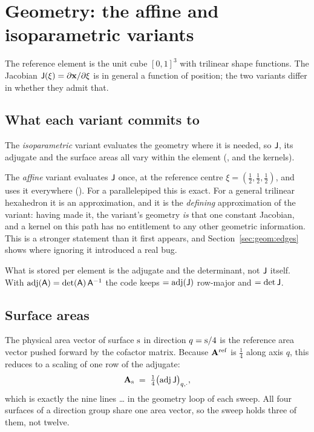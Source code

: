 \section{Geometry: the affine and isoparametric variants}
\label{sec:geom}

The reference element is the unit cube $[0,1]^3$ with trilinear shape functions. The Jacobian
$\mathsf{J}(\xi) = \partial\mathbf{x}/\partial\xi$ is in general a function of position; the two variants
differ in whether they admit that.

\subsection{What each variant commits to}

The \emph{isoparametric} variant evaluates the geometry where it is needed, so $\mathsf{J}$, its
adjugate and the surface areas all vary within the element
(, and the  kernels).

The \emph{affine} variant evaluates $\mathsf{J}$ once, at the reference centre
$\xi = (\tfrac12,\tfrac12,\tfrac12)$, and uses it everywhere
(). For a parallelepiped this is exact. For a general trilinear
hexahedron it is an approximation, and it is the \emph{defining} approximation of the variant:
having made it, the variant's geometry \emph{is} that one constant Jacobian, and a kernel on this
path has no entitlement to any other geometric information. This is a stronger statement than it
first appears, and Section~\ref{sec:geom:edges} shows where ignoring it introduced a real bug.

What is stored per element is the adjugate and the determinant, not $\mathsf{J}$ itself. With
$\operatorname{adj}(\mathsf{A}) = \det(\mathsf{A})\,\mathsf{A}^{-1}$ the code keeps
 $=\operatorname{adj}(\mathsf{J})$ row-major and  $=\det\mathsf{J}$.

\subsection{Surface areas}

The physical area vector of surface $\mathrm{s}$ in direction $q = \mathrm{s}/4$ is the reference area vector
pushed forward by the cofactor matrix. Because $\mathbf{A}^{\mathrm{ref}}$ is $\tfrac14$ along axis
$q$, this reduces to a scaling of one row of the adjugate:
\begin{equation}
\mathbf{A}_{\mathrm{s}} \;=\; \tfrac14 \bigl(\operatorname{adj}\mathsf{J}\bigr)_{q,\cdot} ,
\end{equation}
which is exactly the nine lines  \dots{}  in the geometry
loop of each sweep. All four surfaces of a direction group share one area vector, so the sweep
holds three of them, not twelve.

